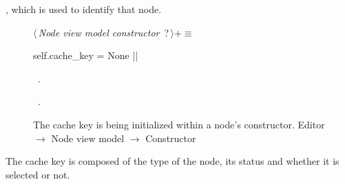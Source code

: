 \documentclass[%
    a4paper,    %
    justified,  %
    nobib,      %
    openany     %
]{tufte-book}
\makeatletter
\renewcommand{\label}[1]{\@tufte@label{##1}}%
\makeatother
\begin{document}
, which is used to identify that
node.

\begin{figure}
\begin{flushleft} \small
\begin{minipage}{\linewidth}\label{scrap74}\raggedright\small
{} $\langle\,${\itshape Node view model constructor}\nobreak\ {\footnotesize {?}}$\,\rangle+\equiv$
\vspace{-1ex}
\begin{pythoncode}
    self.cache_key = None
|\NWsep|
\end{pythoncode}
\vspace{1.5ex}
\footnotesize
\begin{list}{}{\setlength{\itemsep}{-\parsep}\setlength{\itemindent}{-\leftmargin}}
\item \NWtxtMacroDefBy\ .
\item \NWtxtMacroRefIn\ .

\item{}
\end{list}
\end{minipage}\vspace{4ex}
\end{flushleft}
\caption{The cache key is being initialized within a node's constructor.
  \newline{}\newline{}Editor $\rightarrow$ Node view model $\rightarrow$
  Constructor}
\label{editor:lst:node-view-model:constructor:cache-key}
\end{figure}

The cache key is composed of the type of the node, its status and whether it is
selected or not.
\end{document}
